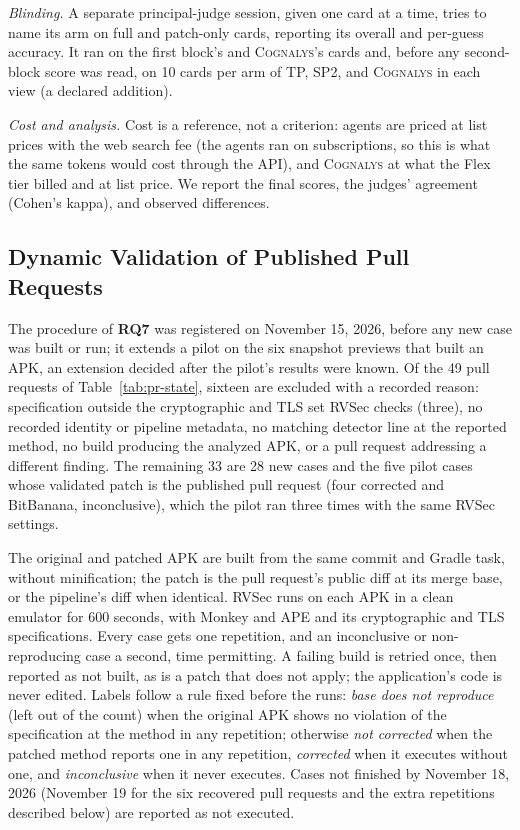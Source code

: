 \documentclass[conference]{IEEEtran}
\newcommand{\system}{\textsc{Cognalys}}
\newcommand{\researchq}[1]{\textbf{RQ#1}}
\begin{document}
\emph{Blinding.} A separate principal-judge session, given one card at a
time, tries to name its arm on full and patch-only cards, reporting its
overall and per-guess accuracy. It ran on the first block's and {\system}'s
cards and, before any second-block score was read, on 10 cards per arm of TP,
SP2, and {\system} in each view (a declared addition).

\emph{Cost and analysis.} Cost is a reference, not a criterion: agents are
priced at list prices with the web search fee (the agents ran on subscriptions,
so this is what the same tokens would cost through the API), and {\system} at what the
Flex tier billed and at list price. We report the final scores, the judges'
agreement (Cohen's kappa), and observed differences.

\subsection{Dynamic Validation of Published Pull Requests}
\label{subsec:dynval}

The procedure of \researchq{7} was registered on November 15, 2026, before any
new case was built or run; it extends a pilot on the six snapshot previews that built an APK, an extension
decided after the pilot's results were known. Of the 49 pull requests of
Table~\ref{tab:pr-state}, sixteen are excluded with a recorded reason:
specification outside the cryptographic and TLS set RVSec checks (three), no
recorded identity or pipeline metadata, no matching detector line at the
reported method, no build producing the analyzed APK, or a pull request
addressing a different finding. The remaining 33 are 28 new cases and the five
pilot cases whose validated patch is the published pull request (four
corrected and BitBanana, inconclusive), which the pilot ran three times with
the same RVSec settings.

The original and patched APK are built from the same commit and Gradle task,
without minification; the patch is the pull request's public diff at its
merge base, or the pipeline's diff when identical. RVSec runs on each APK in a
clean emulator for 600 seconds, with Monkey and APE and its cryptographic and
TLS specifications. Every case gets one repetition, and an inconclusive or
non-reproducing case a second, time permitting. A failing build is retried
once, then reported as not built, as is a patch that does not apply; the
application's code is never edited. Labels follow a rule fixed before the
runs: \emph{base does not reproduce} (left out of the count) when the original
APK shows no violation of the specification at the method in any repetition;
otherwise \emph{not corrected} when the patched method reports one in any
repetition, \emph{corrected} when it executes without one, and
\emph{inconclusive} when it never executes. Cases not finished by November
18, 2026 (November 19 for the six recovered pull requests and the extra
repetitions described below) are reported as not executed.
\end{document}
